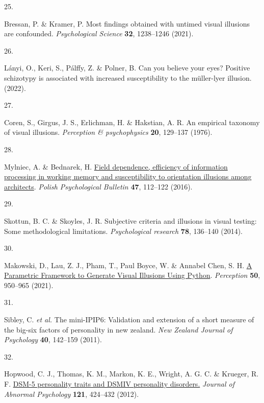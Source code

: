 \documentclass[
  man,floatsintext]{apa6}
\newlength{\cslhangindent}
\newlength{\csllabelwidth}
\newlength{\cslentryspacingunit} %
\newenvironment{CSLReferences}[2] %
 {%
  \setlength{\parindent}{0pt}
  \ifodd #1
  \let\oldpar\par
  \def\par{\hangindent=\cslhangindent\oldpar}
  \fi
  \setlength{\parskip}{#2\cslentryspacingunit}
 }%
 {}
\newcommand{\CSLLeftMargin}[1]{\parbox[t]{\csllabelwidth}{#1}}
\newcommand{\CSLRightInline}[1]{\parbox[t]{\linewidth - \csllabelwidth}{#1}\break}
\begin{document}
\begin{CSLReferences}{0}{0}
\leavevmode{}%
\CSLLeftMargin{25. }%
\CSLRightInline{Bressan, P. \& Kramer, P. Most findings obtained with untimed visual illusions are confounded. \emph{Psychological Science} \textbf{32}, 1238--1246 (2021).}

\leavevmode{}%
\CSLLeftMargin{26. }%
\CSLRightInline{Lányi, O., Keri, S., Pálffy, Z. \& Polner, B. Can you believe your eyes? Positive schizotypy is associated with increased susceptibility to the m{ü}ller-lyer illusion. (2022).}

\leavevmode{}%
\CSLLeftMargin{27. }%
\CSLRightInline{Coren, S., Girgus, J. S., Erlichman, H. \& Hakstian, A. R. An empirical taxonomy of visual illusions. \emph{Perception \& psychophysics} \textbf{20}, 129--137 (1976).}

\leavevmode{}%
\CSLLeftMargin{28. }%
\CSLRightInline{Mylniec, A. \& Bednarek, H. \href{https://doi.org/10.1515/ppb-2016-0012}{Field dependence, efficiency of information processing in working memory and susceptibility to orientation illusions among architects}. \emph{Polish Psychological Bulletin} \textbf{47}, 112--122 (2016).}

\leavevmode{}%
\CSLLeftMargin{29. }%
\CSLRightInline{Skottun, B. C. \& Skoyles, J. R. Subjective criteria and illusions in visual testing: Some methodological limitations. \emph{Psychological research} \textbf{78}, 136--140 (2014).}

\leavevmode{}%
\CSLLeftMargin{30. }%
\CSLRightInline{Makowski, D., Lau, Z. J., Pham, T., Paul Boyce, W. \& Annabel Chen, S. H. \href{https://doi.org/10.1177/03010066211057347}{A Parametric Framework to Generate Visual Illusions Using Python}. \emph{Perception} \textbf{50}, 950--965 (2021).}

\leavevmode{}%
\CSLLeftMargin{31. }%
\CSLRightInline{Sibley, C. \emph{et al.} The mini-IPIP6: Validation and extension of a short measure of the big-six factors of personality in new zealand. \emph{New Zealand Journal of Psychology} \textbf{40}, 142--159 (2011).}

\leavevmode{}%
\CSLLeftMargin{32. }%
\CSLRightInline{Hopwood, C. J., Thomas, K. M., Markon, K. E., Wright, A. G. C. \& Krueger, R. F. \href{https://doi.org/10.1037/a0026656}{DSM-5 personality traits and DSM{\textendash}IV personality disorders.} \emph{Journal of Abnormal Psychology} \textbf{121}, 424--432 (2012).}


\end{CSLReferences}
\end{document}
